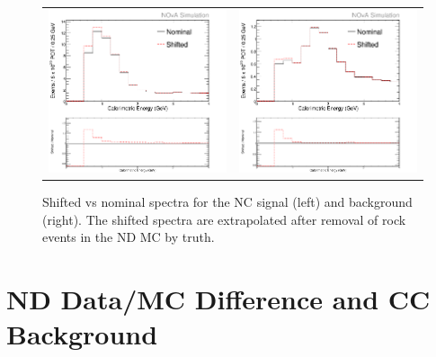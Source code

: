 \begin{figure}[htb]
  \centering
  \begin{tabular}{c c}
    \includegraphics[width=.47\textwidth]{figures/Systs/cNCEXNDRockSysts.png} &
    \includegraphics[width=.47\textwidth]{figures/Systs/cBGEXNDRockSysts.png} \\
  \end{tabular}
  \caption[ND Rock Contamination Shifted Spectra]{Shifted vs nominal spectra for the NC signal (left) and background (right). The shifted spectra are extrapolated after removal of rock events in the ND MC by truth.}
  \label{fig:SystNDRock}
\end{figure}

\section{ND Data/MC Difference and CC Background}
\label{sec:DataMC}

